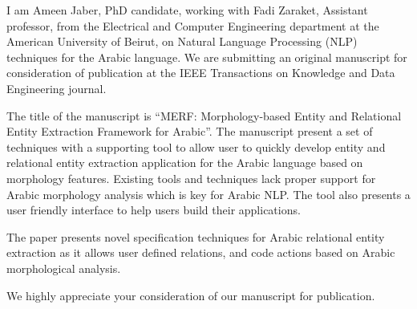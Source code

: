 \documentclass[10pt,stdletter,dateno,sigleft]{newlfm}
\begin{document}
\begin{newlfm}


I am Ameen Jaber, PhD candidate,  working with Fadi Zaraket, Assistant professor, 
from the Electrical and Computer Engineering department at the American University of Beirut, 
on Natural Language Processing (NLP) techniques for the Arabic language. 
We are submitting an original manuscript for consideration of publication at 
the IEEE Transactions on Knowledge and Data Engineering journal.

The title of the manuscript is ``MERF: Morphology-based Entity and Relational Entity Extraction Framework for Arabic''.
The manuscript present a set of techniques with a supporting tool to allow user to quickly develop entity and relational
entity extraction application for the Arabic language based on morphology features. 
Existing tools and techniques lack proper support for Arabic morphology analysis which is key for Arabic NLP.
The tool also presents a user friendly interface to help users build their applications. 

The paper presents novel specification techniques for Arabic relational entity extraction as it allows 
user defined relations, and code actions based on Arabic morphological analysis. 

We highly appreciate your consideration of our manuscript for publication.


\end{newlfm}
\end{document}
